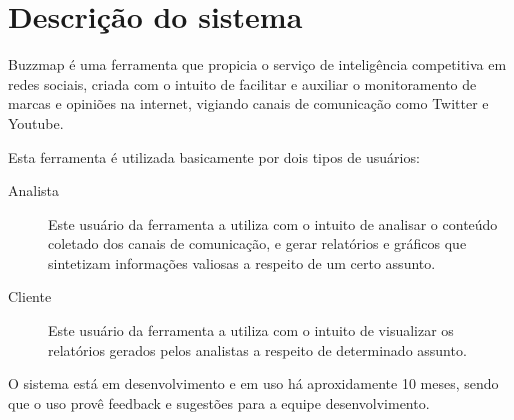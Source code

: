 \section{Descrição do sistema}
Buzzmap é uma ferramenta que propicia o serviço de inteligência
competitiva em redes sociais, criada com o intuito de facilitar e
auxiliar o monitoramento de marcas e opiniões na internet, vigiando
canais de comunicação como Twitter e Youtube.

Esta ferramenta é utilizada basicamente por dois tipos de usuários:
\begin{description}
    \item[Analista] Este usuário da ferramenta a utiliza com o intuito
    de analisar o conteúdo coletado dos canais de comunicação, e gerar
    relatórios e gráficos que sintetizam informações valiosas a
    respeito de um certo assunto.

    \item[Cliente] Este usuário da ferramenta a utiliza com o intuito
    de visualizar os relatórios gerados pelos analistas a respeito de
    determinado assunto.
\end{description}

O sistema está em desenvolvimento e em uso há aproxidamente 10 meses,
sendo que o uso provê feedback e sugestões para a equipe
desenvolvimento.
